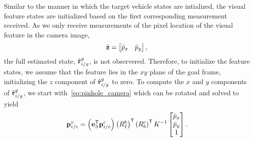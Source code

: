 Similar to the manner in which the target vehicle states are intialized,
the visual feature states are initialized based on the first corresponding measurement received.
As we only receive measurements of the pixel
location of the visual feature in the camera image,
\begin{equation}
  \bar{\boldsymbol{\mathrm{z}}} = \begin{bmatrix} \bar{p}_x & \bar{p}_y \end{bmatrix}
  \label{eq:pixel_meas},
\end{equation}
the full estimated state, $\hat{\boldsymbol{\mathrm{r}}}_{i/g}^g$, is not observered.
Therefore, to initialize
the feature states, we assume that the feature lies in the $xy$ plane of the
goal frame, initializing the $z$ component of $\hat{\boldsymbol{\mathrm{r}}}_{i/g}^g$ to zero.
To compute the
$x$ and $y$ components of $\hat{\boldsymbol{\mathrm{r}}}_{i/g}^g$,
we start with~\eqref{eq:pinhole_camera}
which can be rotated and solved to yield
\begin{equation}
 \boldsymbol{\mathrm{p}}_{i/c}^v
  =
  \left( \boldsymbol{\mathrm{e}}_3^{\mathsf{T}} \boldsymbol{\mathrm{p}}_{i/c}^c \right) \left( R_I^b
  \right)^{\mathsf{T}} \left( R_b^c \right)^{\mathsf{T}} K^{-1} \begin{bmatrix}
    \bar{p}_x \\ \bar{p}_y \\ 1
  \end{bmatrix}.
\end{equation}
